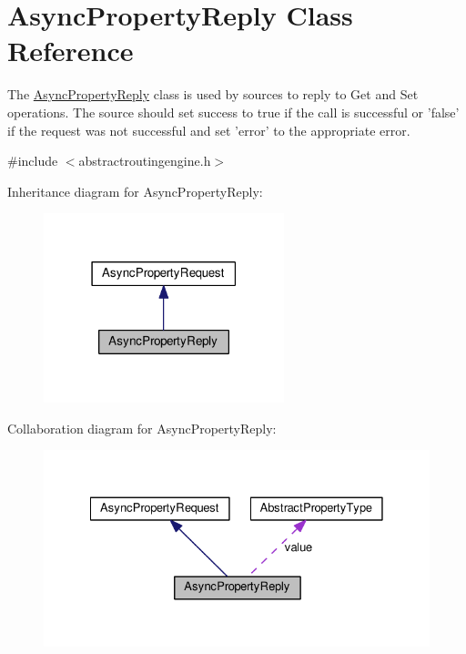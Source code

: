 \hypertarget{classAsyncPropertyReply}{\section{Async\+Property\+Reply Class Reference}
\label{classAsyncPropertyReply}
}


The \hyperlink{classAsyncPropertyReply}{Async\+Property\+Reply} class is used by sources to reply to Get and Set operations. The source should set success to true if the call is successful or 'false' if the request was not successful and set 'error' to the appropriate error.  




{\ttfamily \#include $<$abstractroutingengine.\+h$>$}



Inheritance diagram for Async\+Property\+Reply\+:\nopagebreak
\begin{figure}[H]
\begin{center}
\leavevmode
\includegraphics[width=198pt]{classAsyncPropertyReply__inherit__graph}
\end{center}
\end{figure}


Collaboration diagram for Async\+Property\+Reply\+:\nopagebreak
\begin{figure}[H]
\begin{center}
\leavevmode
\includegraphics[width=328pt]{classAsyncPropertyReply__coll__graph}
\end{center}
\end{figure}
